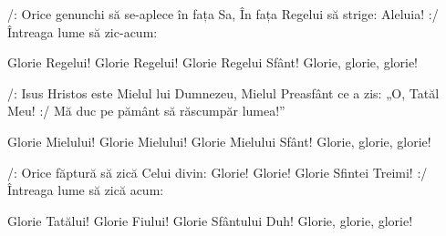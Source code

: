 \beginverse
/: Orice genunchi să se-aplece în fața Sa,
În fața Regelui să strige: Aleluia! :/
Întreaga lume să zic-acum:
\endverse

\beginchorus
Glorie Regelui!
Glorie Regelui!
Glorie Regelui Sfânt!
Glorie, glorie, glorie!
\endchorus

\beginverse
/: Isus Hristos este Mielul lui Dumnezeu,
Mielul Preasfânt ce a zis: „O, Tatăl Meu! :/
Mă duc pe pământ să răscumpăr lumea!”
\endverse

\beginchorus
Glorie Mielului!
Glorie Mielului!
Glorie Mielului Sfânt!
Glorie, glorie, glorie!
\endchorus

\beginverse
/: Orice făptură să zică Celui divin:
Glorie! Glorie! Glorie Sfintei Treimi! :/
Întreaga lume să zică acum:
\endverse

\beginchorus
Glorie Tatălui!
Glorie Fiului!
Glorie Sfântului Duh!
Glorie, glorie, glorie!
\endchorus
\endsong